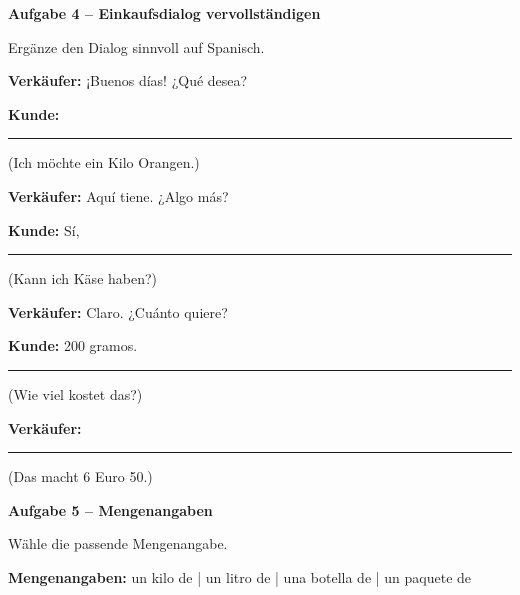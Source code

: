 \documentclass[11pt, a4paper]{article}
\newcommand{\fachfarbe}{spanisch}
\newcommand{\punktebox}[1]{\hfill\fbox{\small \_/#1}}
\newcommand{\luecke}[1]{\rule{#1}{0.4pt}}
\newenvironment{aufgabe}[1]{%
    \needspace{5\baselineskip}%
    \nopagebreak[4]%
    \vspace{10pt}
    \noindent\textbf{\textcolor{\fachfarbe}{Aufgabe #1}}
    \nopagebreak[4]%
    \vspace{5pt}
    \nopagebreak[4]%
    \begin{list}{}{\leftmargin=0pt}
    \item[]
}{%
    \end{list}
}
\begin{document}
\vspace{15pt}


\begin{aufgabe}{4 -- Einkaufsdialog vervollständigen}
Ergänze den Dialog sinnvoll auf Spanisch. \punktebox{8}
\end{aufgabe}

\noindent
\textbf{Verkäufer:} ¡Buenos días! ¿Qué desea?

\vspace{0.8em}

\noindent
\textbf{Kunde:} \luecke{8cm} \hfill (Ich möchte ein Kilo Orangen.)

\vspace{0.8em}

\noindent
\textbf{Verkäufer:} Aquí tiene. ¿Algo más?

\vspace{0.8em}

\noindent
\textbf{Kunde:} Sí, \luecke{6cm} \hfill (Kann ich Käse haben?)

\vspace{0.8em}

\noindent
\textbf{Verkäufer:} Claro. ¿Cuánto quiere?

\vspace{0.8em}

\noindent
\textbf{Kunde:} 200 gramos. \luecke{4cm} \hfill (Wie viel kostet das?)

\vspace{0.8em}

\noindent
\textbf{Verkäufer:} \luecke{6cm} \hfill (Das macht 6 Euro 50.)

\vspace{15pt}


\begin{aufgabe}{5 -- Mengenangaben}
Wähle die passende Mengenangabe. \punktebox{4}
\end{aufgabe}

\begin{hinweis}
\textbf{Mengenangaben:} un kilo de | un litro de | una botella de | un paquete de
\end{hinweis}
\end{document}
